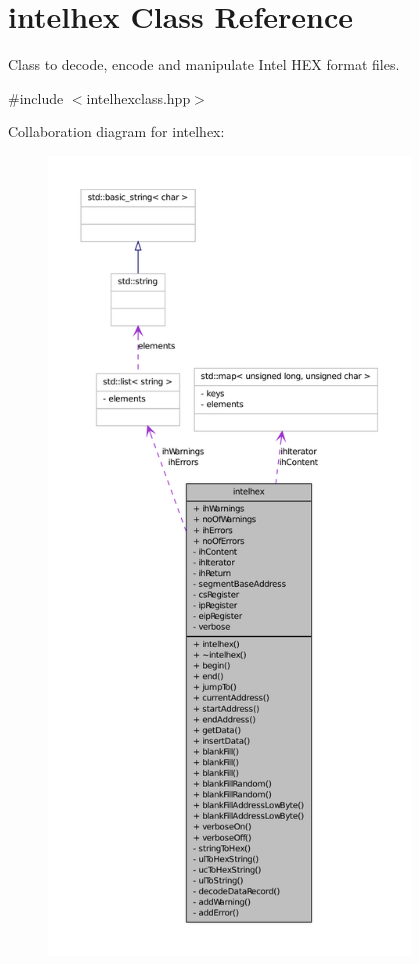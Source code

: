 \hypertarget{classintelhex}{
\section{intelhex Class Reference}
\label{classintelhex}
}


Class to decode, encode and manipulate Intel HEX format files.  




{\ttfamily \#include $<$intelhexclass.hpp$>$}



Collaboration diagram for intelhex:
\nopagebreak
\begin{figure}[H]
\begin{center}
\leavevmode
\includegraphics[height=600pt]{classintelhex__coll__graph}
\end{center}
\end{figure}
